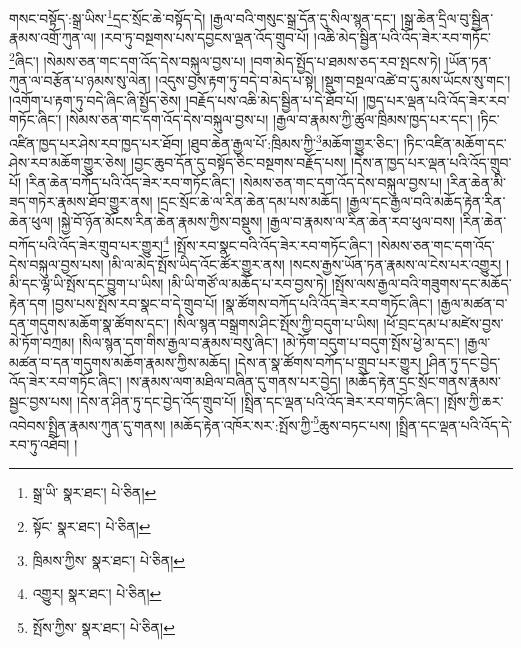 གསང་བསྟོད་:སྒྲ་ཡིས་\footnote{སྒྲ་ཡི་  སྣར་ཐང་།  པེ་ཅིན། }དྲང་སྲོང་ཆེ་བསྟོད་དེ། །རྒྱལ་བའི་གསུང་སྒྲ་དོན་དུ་སིལ་སྙན་དང་། །སྒྲ་ཆེན་དྲིལ་བུ་སྦྱིན་རྣམས་འགྲོ་ཀུན་ལ། །རབ་ཏུ་བསྔགས་པས་དབྱངས་ལྡན་འོད་གྲུབ་པོ། །འཆི་མེད་སྦྱིན་པའི་འོད་ཟེར་རབ་གཏོང་\footnote{སྟོང་  སྣར་ཐང་།  པེ་ཅིན། }ཞིང་། །སེམས་ཅན་གང་དག་འོད་དེས་བསྐུལ་བྱས་པ། །བག་མེད་སྤྱོད་པ་ཐམས་ཅད་རབ་སྤངས་ཏེ། །ཡོན་ཏན་ཀུན་ལ་བརྩོན་པ་ཉམས་སུ་ལེན། །འདུས་བྱས་རྟག་ཏུ་བདེ་བ་མེད་པ་སྟེ། །སྡུག་བསྔལ་འཚེ་བ་དུ་མས་ཡོངས་སུ་གང་། །འགོག་པ་རྟག་ཏུ་བདེ་ཞིང་ཞི་སྤྱོད་ཅེས། །བརྗོད་པས་འཆི་མེད་སྦྱིན་པ་དེ་ཐོབ་པོ། །ཁྱད་པར་ལྡན་པའི་འོད་ཟེར་རབ་གཏོང་ཞིང་། །སེམས་ཅན་གང་དག་འོད་དེས་བསྐུལ་བྱས་པ། །རྒྱལ་བ་རྣམས་ཀྱི་ཚུལ་ཁྲིམས་ཁྱད་པར་དང་། །ཏིང་འཛིན་ཁྱད་པར་ཤེས་རབ་ཁྱད་པར་ཐོབ། །ཐུབ་ཆེན་རྒྱལ་པོ་:ཁྲིམས་ཀྱི་\footnote{ཁྲིམས་ཀྱིས་  སྣར་ཐང་།  པེ་ཅིན། }མཆོག་གྱུར་ཅིང་། །ཏིང་འཛིན་མཆོག་དང་ཤེས་རབ་མཆོག་གྱུར་ཅེས། །བྱང་ཆུབ་དོན་དུ་བསྟོད་ཅིང་བསྔགས་བརྗོད་པས། །དེས་ན་ཁྱད་པར་ལྡན་པའི་འོད་གྲུབ་པོ། །རིན་ཆེན་བཀོད་པའི་འོད་ཟེར་རབ་གཏོང་ཞིང་། །སེམས་ཅན་གང་དག་འོད་དེས་བསྐུལ་བྱས་པ། །རིན་ཆེན་མི་ཟད་གཏེར་རྣམས་ཐོབ་གྱུར་ནས། །དྲང་སྲོང་ཆེ་ལ་རིན་ཆེན་དམ་པས་མཆོད། །རྒྱལ་དང་རྒྱལ་བའི་མཆོད་རྟེན་རིན་ཆེན་ཕུལ། །སྐྱེ་བོ་ཉོན་མོངས་རིན་ཆེན་རྣམས་ཀྱིས་བསྡུས། །རྒྱལ་བ་རྣམས་ལ་རིན་ཆེན་རབ་ཕུལ་བས། །རིན་ཆེན་བཀོད་པའི་འོད་ཟེར་གྲུབ་པར་གྱུར།\footnote{འགྱུར།  སྣར་ཐང་།  པེ་ཅིན། } །སྤོས་རབ་སྣང་བའི་འོད་ཟེར་རབ་གཏོང་ཞིང་། །སེམས་ཅན་གང་དག་འོད་དེས་བསྐུལ་བྱས་པས། །མི་ལ་མེད་སྤོས་ཡིད་འོང་ཚོར་གྱུར་ནས། །སངས་རྒྱས་ཡོན་ཏན་རྣམས་ལ་ངེས་པར་འགྱུར། །མི་དང་ལྷ་ཡི་སྤོས་དང་བྱུག་པ་ཡིས། །མི་ཡི་གཙོ་ལ་མཆོད་པ་རབ་བྱས་ཏེ། །སྤོས་ལས་རྒྱལ་བའི་གཟུགས་དང་མཆོད་རྟེན་དག །བྱས་པས་སྤོས་རབ་སྣང་བ་དེ་གྲུབ་པོ། །སྣ་ཚོགས་བཀོད་པའི་འོད་ཟེར་རབ་གཏོང་ཞིང་། །རྒྱལ་མཚན་བ་དན་གདུགས་མཆོག་སྣ་ཚོགས་དང་། །སིལ་སྙན་བསྒྲགས་ཤིང་སྤོས་ཀྱི་བདུག་པ་ཡིས། །ཕོ་བྲང་དམ་པ་མཛེས་བྱས་མེ་ཏོག་བཀྲམ། །སིལ་སྙན་དག་གིས་རྒྱལ་བ་རྣམས་བསུ་ཞིང་། །མེ་ཏོག་བདུག་པ་བདུག་སྤོས་ཕྱེ་མ་དང་། །རྒྱལ་མཚན་བ་དན་གདུགས་མཆོག་རྣམས་ཀྱིས་མཆོད། །དེས་ན་སྣ་ཚོགས་བཀོད་པ་གྲུབ་པར་གྱུར། །ཤིན་ཏུ་དང་བྱེད་འོད་ཟེར་རབ་གཏོང་ཞིང་། །ས་རྣམས་ལག་མཐིལ་བཞིན་དུ་གནས་པར་བྱེད། །མཆོད་རྟེན་དྲང་སྲོང་གནས་རྣམས་སྦྱང་བྱས་པས། །དེས་ན་ཤིན་ཏུ་དང་བྱེད་འོད་གྲུབ་པོ། །སྤྲིན་དང་ལྡན་པའི་འོད་ཟེར་རབ་གཏོང་ཞིང་། །སྤོས་ཀྱི་ཆར་འབེབས་སྤྲིན་རྣམས་ཀུན་དུ་གནས། །མཆོད་རྟེན་འཁོར་སར་:སྤོས་ཀྱི་\footnote{སྤོས་ཀྱིས་  སྣར་ཐང་།  པེ་ཅིན། }ཆུས་བཏང་པས། །སྤྲིན་དང་ལྡན་པའི་འོད་དེ་རབ་ཏུ་འཐོབ། །

